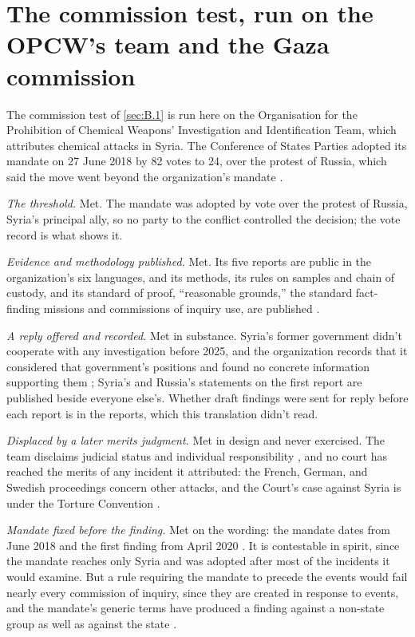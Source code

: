 \section{The commission test, run on the OPCW's team and the Gaza commission}
\label{sec:B.2}
The commission test of \ref{sec:B.1} is run here on the Organisation for the Prohibition of Chemical Weapons' Investigation and Identification Team, which attributes chemical attacks in Syria. The Conference of States Parties adopted its mandate on 27 June 2018 by 82 votes to 24, over the protest of Russia, which said the move went beyond the organization's mandate \autocite{opcw2018attribution,bbc2018opcwblame}.

\emph{The threshold.} Met. The mandate was adopted by vote over the protest of Russia, Syria's principal ally, so no party to the conflict controlled the decision; the vote record is what shows it.

\emph{Evidence and methodology published.} Met. Its five reports are public in the organization's six languages, and its methods, its rules on samples and chain of custody, and its standard of proof, “reasonable grounds,” the standard fact-finding missions and commissions of inquiry use, are published \autocite{opcw2026iitpage}.

\emph{A reply offered and recorded.} Met in substance. Syria's former government didn't cooperate with any investigation before 2025, and the organization records that it considered that government's positions and found no concrete information supporting them \autocite{opcw2026iitkafrzeita}; Syria's and Russia's statements on the first report are published beside everyone else's. Whether draft findings were sent for reply before each report is in the reports, which this translation didn't read.

\emph{Displaced by a later merits judgment.} Met in design and never exercised. The team disclaims judicial status and individual responsibility \autocite{opcw2026iitpage}, and no court has reached the merits of any incident it attributed: the French, German, and Swedish proceedings concern other attacks, and the Court's case against Syria is under the Torture Convention \autocite{osji2021frenchcw,icj2023canadasyria}.

\emph{Mandate fixed before the finding.} Met on the wording: the mandate dates from June 2018 and the first finding from April 2020 \autocite{opcw2020iitltamenah}. It is contestable in spirit, since the mandate reaches only Syria and was adopted after most of the incidents it would examine. But a rule requiring the mandate to precede the events would fail nearly every commission of inquiry, since they are created in response to events, and the mandate's generic terms have produced a finding against a non-state group as well as against the state \autocite{opcw2024iitmarea}.

